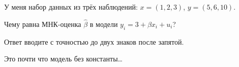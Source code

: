 
\begin{question}
У меня набор данных из трёх наблюдений: \(x = (1, 2, 3)\), \(y = (5, 6, 10)\).

Чему равна МНК-оценка \(\hat\beta\) в модели \(y_i = 3 + \beta x_i + u_i\)?

Ответ вводите с точностью до двух знаков после запятой.
\end{question}

\begin{solution}
Это почти что модель без константы\ldots{}
\end{solution}

